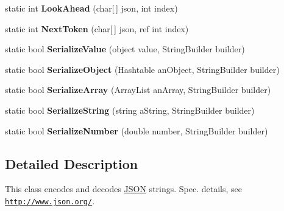 \begin{DoxyCompactItemize}
\item 
\hypertarget{classProcurios_1_1Public_1_1JSON_a94c3a5193fac38f9b6648404ebb6b86a}{static int {\bfseries Look\-Ahead} (char\mbox{[}$\,$\mbox{]} json, int index)}\label{classProcurios_1_1Public_1_1JSON_a94c3a5193fac38f9b6648404ebb6b86a}

\item 
\hypertarget{classProcurios_1_1Public_1_1JSON_ae3bf55097865718de308e0407aea2191}{static int {\bfseries Next\-Token} (char\mbox{[}$\,$\mbox{]} json, ref int index)}\label{classProcurios_1_1Public_1_1JSON_ae3bf55097865718de308e0407aea2191}

\item 
\hypertarget{classProcurios_1_1Public_1_1JSON_a85b20488d5e89f5d5570dcf7ff045a64}{static bool {\bfseries Serialize\-Value} (object value, String\-Builder builder)}\label{classProcurios_1_1Public_1_1JSON_a85b20488d5e89f5d5570dcf7ff045a64}

\item 
\hypertarget{classProcurios_1_1Public_1_1JSON_afcd742a1caed7b8df34868cab7faaf7e}{static bool {\bfseries Serialize\-Object} (Hashtable an\-Object, String\-Builder builder)}\label{classProcurios_1_1Public_1_1JSON_afcd742a1caed7b8df34868cab7faaf7e}

\item 
\hypertarget{classProcurios_1_1Public_1_1JSON_a720d9cc6239bc4c5b137baf947014ed6}{static bool {\bfseries Serialize\-Array} (Array\-List an\-Array, String\-Builder builder)}\label{classProcurios_1_1Public_1_1JSON_a720d9cc6239bc4c5b137baf947014ed6}

\item 
\hypertarget{classProcurios_1_1Public_1_1JSON_aac24706b51664ac548cf247cc6facdeb}{static bool {\bfseries Serialize\-String} (string a\-String, String\-Builder builder)}\label{classProcurios_1_1Public_1_1JSON_aac24706b51664ac548cf247cc6facdeb}

\item 
\hypertarget{classProcurios_1_1Public_1_1JSON_a0d383eeaab649ef0c1281132776d5630}{static bool {\bfseries Serialize\-Number} (double number, String\-Builder builder)}\label{classProcurios_1_1Public_1_1JSON_a0d383eeaab649ef0c1281132776d5630}

\end{DoxyCompactItemize}


\subsection{Detailed Description}
This class encodes and decodes \hyperlink{classProcurios_1_1Public_1_1JSON}{J\-S\-O\-N} strings. Spec. details, see \href{http://www.json.org/}{\tt http\-://www.\-json.\-org/}. 

